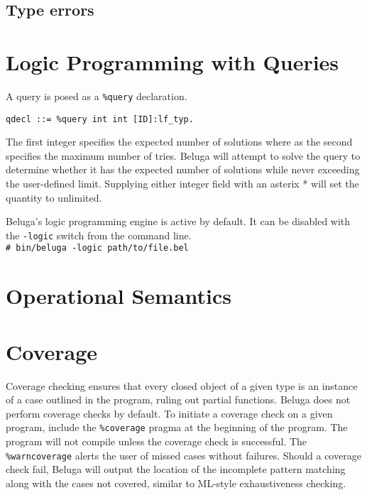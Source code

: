 \documentclass[11pt]{article}
\newcommand{\shellcmd}[1]{\\\indent\texttt{\# #1}\\}
\begin{document}
\subsection{Type errors}


\section{Logic Programming with Queries}
A query is posed as a \texttt{\%query} declaration.
\begin{verbatim}
qdecl ::= %query int int [ID]:lf_typ.
\end{verbatim}
The first integer specifies the expected number of solutions where as the second specifies the maximum number of tries. Beluga will attempt to solve the query to determine whether it has the expected number of solutions while never exceeding the user-defined limit. Supplying either integer field with an asterix * will set the quantity to unlimited. 

Beluga's logic programming engine is active by default. It can be disabled with the \texttt{-logic} switch from the command line.
\shellcmd{bin/beluga -logic path/to/file.bel}


\section{Operational Semantics}



\section{Coverage}
Coverage checking ensures that every closed object of a given type is an instance of a case outlined in the program, ruling out partial functions. Beluga does not perform coverage checks by default. To initiate a coverage check on a given program, include the \texttt{\%coverage} pragma at the beginning of the program. The program will not compile unless the coverage check is successful. The \texttt{\%warncoverage} alerts the user of missed cases without failures. Should a coverage check fail, Beluga will output the location of the incomplete pattern matching along with the cases not covered, similar to ML-style exhaustiveness checking.  
\end{document}
